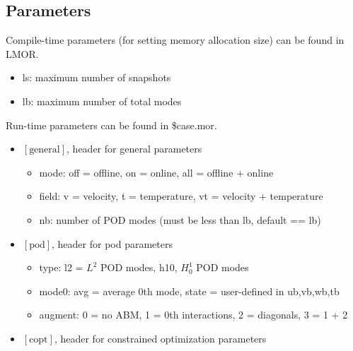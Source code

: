\newpage

\subsection{Parameters}

Compile-time parameters (for setting memory allocation size) can be found in
LMOR.

\begin{itemize}
\item ls: maximum number of snapshots
\item lb: maximum number of total modes
\end{itemize}

Run-time parameters can be found in \$case.mor.
\begin{itemize}
\item $[\text{general}]$, header for general parameters
   \begin{itemize}
   \item mode: off = offline, on = online, all = offline + online
   \item field: v = velocity, t = temperature, vt = velocity + temperature
   \item nb: number of POD modes (must be less than lb, default == lb)
   \end{itemize}
\item $[\text{pod}]$, header for pod parameters
   \begin{itemize}
    \item type: l2 = $L^2$ POD modes, h10, $H^1_0$ POD modes
    \item mode0: avg = average 0th mode, state = user-defined in ub,vb,wb,tb
    \item augment: 0 = no ABM, 1 = 0th interactions, 2 = diagonals, 3 = 1 + 2 \cite{kaneko2022augmented}
   \end{itemize}
\item $[\text{copt}]$, header for constrained optimization parameters \cite{kaneko2020towards}\cite{tsai2022parametric}


\end{itemize}
